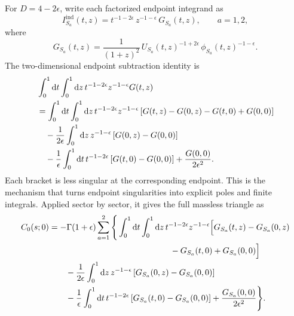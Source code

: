\documentclass[11pt]{article}
\newcommand{\dd}{\mathrm d}
\newcommand{\eps}{\epsilon}
\begin{document}
For \(D=4-2\eps\), write each factorized endpoint integrand as
\begin{equation}
  I_{S_a}^{\mathrm{ind}}(t,z)
  =
  t^{-1-2\eps}\,
  z^{-1-\eps}\,
  G_{S_a}(t,z),
  \qquad
  a=1,2,
\end{equation}
where
\begin{equation}
  G_{S_a}(t,z)
  =
  \frac{1}{(1+z)^2}\,
  U_{S_a}(t,z)^{-1+2\eps}\,
  \phi_{S_a}(t,z)^{-1-\eps}.
\end{equation}
The two-dimensional endpoint subtraction identity is
\begin{align}
  &\int_0^1 \dd t\int_0^1 \dd z\,
  t^{-1-2\eps}z^{-1-\eps}G(t,z)
  \notag\\
  &=
  \int_0^1 \dd t\int_0^1 \dd z\,
  t^{-1-2\eps}z^{-1-\eps}
  \left[
    G(t,z)-G(0,z)-G(t,0)+G(0,0)
  \right]
  \notag\\
  &\quad
  -\frac{1}{2\eps}
  \int_0^1 \dd z\,
  z^{-1-\eps}
  \left[
    G(0,z)-G(0,0)
  \right]
  \notag\\
  &\quad
  -\frac{1}{\eps}
  \int_0^1 \dd t\,
  t^{-1-2\eps}
  \left[
    G(t,0)-G(0,0)
  \right]
  +
  \frac{G(0,0)}{2\eps^2}.
\end{align}
Each bracket is less singular at the corresponding endpoint.  This is the
mechanism that turns endpoint singularities into explicit poles and finite
integrals.
Applied sector by sector, it gives the full massless triangle as
\begin{align}
  C_0(s;0)
  &=
  -\Gamma(1+\eps)
  \sum_{a=1}^{2}
  \Bigg\{
  \int_0^1 \dd t\int_0^1 \dd z\,
  t^{-1-2\eps}z^{-1-\eps}
  \Big[
    G_{S_a}(t,z)-G_{S_a}(0,z)
  \notag\\
  &\hspace{5.1cm}
    -G_{S_a}(t,0)+G_{S_a}(0,0)
  \Big]
  \notag\\
  &\qquad
  -\frac{1}{2\eps}
  \int_0^1 \dd z\,
  z^{-1-\eps}
  \left[
    G_{S_a}(0,z)-G_{S_a}(0,0)
  \right]
  \notag\\
  &\qquad
  -\frac{1}{\eps}
  \int_0^1 \dd t\,
  t^{-1-2\eps}
  \left[
    G_{S_a}(t,0)-G_{S_a}(0,0)
  \right]
  +
  \frac{G_{S_a}(0,0)}{2\eps^2}
  \Bigg\}.
\end{align}
\end{document}
